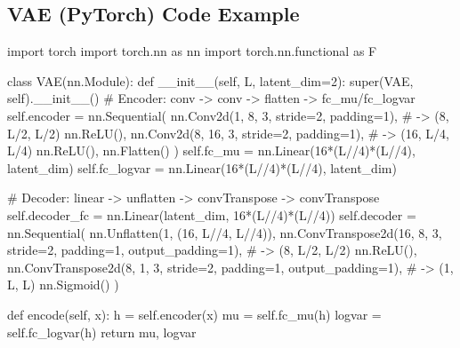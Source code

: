\documentclass[%
oneside,                 %
final,                   %
10pt]{article}
\begin{document}
\noindent
\subsection{VAE (PyTorch) Code Example}






















































\bpycod
import torch
import torch.nn as nn
import torch.nn.functional as F

class VAE(nn.Module):
   def __init__(self, L, latent_dim=2):
       super(VAE, self).__init__()
       # Encoder: conv -> conv -> flatten -> fc_mu/fc_logvar
       self.encoder = nn.Sequential(
           nn.Conv2d(1, 8, 3, stride=2, padding=1),   # -> (8, L/2, L/2)
           nn.ReLU(),
           nn.Conv2d(8, 16, 3, stride=2, padding=1),  # -> (16, L/4, L/4)
           nn.ReLU(),
           nn.Flatten()
       )
       self.fc_mu = nn.Linear(16*(L//4)*(L//4), latent_dim)
       self.fc_logvar = nn.Linear(16*(L//4)*(L//4), latent_dim)

       # Decoder: linear -> unflatten -> convTranspose -> convTranspose
       self.decoder_fc = nn.Linear(latent_dim, 16*(L//4)*(L//4))
       self.decoder = nn.Sequential(
           nn.Unflatten(1, (16, L//4, L//4)),
           nn.ConvTranspose2d(16, 8, 3, stride=2, padding=1, output_padding=1),  # -> (8, L/2, L/2)
           nn.ReLU(),
           nn.ConvTranspose2d(8, 1, 3, stride=2, padding=1, output_padding=1),   # -> (1, L, L)
           nn.Sigmoid()
       )

   def encode(self, x):
       h = self.encoder(x)
       mu = self.fc_mu(h)
       logvar = self.fc_logvar(h)
       return mu, logvar
\end{document}

